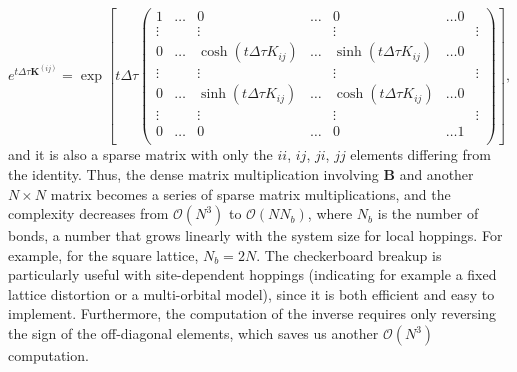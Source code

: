 \begin{equation}
e^{t\Delta\tau \bm K^{(ij)} } = \exp \left[ t\Delta\tau
\begin{pmatrix}
1 & \dots & 0 & \dots & 0 & \dots 0 \\
\vdots & & \vdots & & \vdots & & \vdots \\
0 & \dots & \cosh (  t\Delta\tau K_{ij} ) & \dots & \sinh (  t\Delta\tau K_{ij} ) & \dots 0 \\
\vdots & & \vdots & & \vdots & & \vdots \\
0 & \dots & \sinh (  t\Delta\tau K_{ij} ) & \dots & \cosh (  t\Delta\tau K_{ij} ) & \dots 0 \\
\vdots & & \vdots & & \vdots & & \vdots \\
0 & \dots & 0 & \dots & 0 & \dots 1 \\
\end{pmatrix}
\right] ,
\end{equation}
and it is also a sparse matrix with only the $ii$, $ij$, $ji$, $jj$ elements differing from the identity.
Thus, the dense matrix multiplication involving $\bm B$ and another $N \times N$ matrix becomes a series of sparse matrix multiplications, and the complexity decreases from $\mathcal{O}(N^3)$ to $\mathcal{O}(N N_b)$, where $N_b$ is the number of bonds, a number that grows linearly with the system size for local hoppings.
For example, for the square lattice, $N_b = 2 N$.
The checkerboard breakup is particularly useful with site-dependent hoppings (indicating for example a fixed lattice distortion or a multi-orbital model), since it is both efficient and easy to implement.
Furthermore, the computation of the inverse requires only reversing the sign of the off-diagonal elements, which saves us another $\mathcal{O}(N^3)$ computation.
